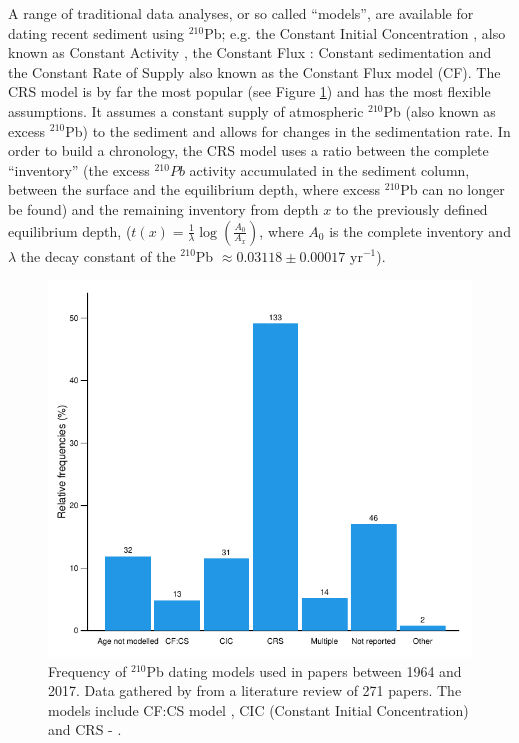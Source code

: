 \documentclass [10pt] {article}
\begin{document}
A range of traditional data analyses, or so called ``models'', are available for dating recent sediment using $^{210}$Pb; e.g. the Constant Initial Concentration \citep[CIC,][]{Goldberg1963}, also known as Constant Activity \citep[CA,][]{Robbins1975}, the Constant Flux : Constant sedimentation \citep[CFCS,][]{Crozaz1964} and the Constant Rate of Supply  \citep[CRS,][]{Appleby1978,Robbins1978,Sanchez-Cabeza2012} also known as the Constant Flux model (CF). 
The CRS model is by far the most popular (see Figure \ref{fig:210models}) and has the most flexible assumptions. 
It assumes a constant supply of atmospheric $^{210}$Pb (also known as excess $^{210}$Pb) to the sediment and allows for changes in the sedimentation rate. 
In order to build a chronology, the CRS model uses a ratio between the complete ``inventory'' (the excess $^{210}Pb$ activity accumulated in the sediment column, between the surface and the equilibrium depth, where excess $^{210}$Pb  can no longer be found) and the remaining  inventory from depth $x$ to the previously defined equilibrium depth, ($t(x)=\frac{1}{\lambda}\log\left( \frac{A_0}{A_x}\right)$, where $A_0$ is the complete inventory and $\lambda$ the decay constant of the $^{210}$Pb $\approx 0.03118\pm 0.00017$ yr$^{-1}$).
\begin{figure}[h!]
	\begin{centering}
		\includegraphics[width=.75\linewidth]{barras.pdf}
		\caption{Frequency of $^{210}$Pb dating models used in papers between 1964 and 2017. Data gathered by \citet{Courtney2019} from a literature review of 271 papers. The models include CF:CS model \citep[The Constant Flux - Constant Sedimentation;][]{Robbins1978}, CIC (Constant Initial Concentration) \citep{Goldberg1963,Crozaz1964,Robbins1978} and CRS -  \citep[Constant Rate of Supply;][]{Appleby1978,Robbins1978}. }
		\label{fig:210models}
	\end{centering}
\end{figure}
\end{document}
